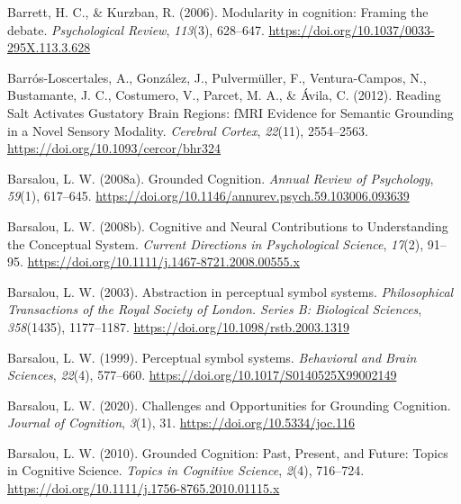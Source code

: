\documentclass[
  a4paper,12pt,twoside,onecolumn,openright,final,oldfontcommands]{memoir}
\newlength{\cslhangindent}
\newlength{\cslentryspacingunit} %
\newenvironment{CSLReferences}[2] %
 {%
  \setlength{\parindent}{0pt}
  \ifodd #1
  \let\oldpar\par
  \def\par{\hangindent=\cslhangindent\oldpar}
  \fi
  \setlength{\parskip}{#2\cslentryspacingunit}
 }%
 {}
\begin{document}
\begin{CSLReferences}{1}{0}
\leavevmode{}%
Barrett, H. C., \& Kurzban, R. (2006). Modularity in cognition: {Framing} the debate. \emph{Psychological Review}, \emph{113}(3), 628--647. \url{https://doi.org/10.1037/0033-295X.113.3.628}

\leavevmode{}%
Barrós-Loscertales, A., González, J., Pulvermüller, F., Ventura-Campos, N., Bustamante, J. C., Costumero, V., Parcet, M. A., \& Ávila, C. (2012). Reading {Salt} {Activates} {Gustatory} {Brain} {Regions}: {fMRI} {Evidence} for {Semantic} {Grounding} in a {Novel} {Sensory} {Modality}. \emph{Cerebral Cortex}, \emph{22}(11), 2554--2563. \url{https://doi.org/10.1093/cercor/bhr324}

\leavevmode{}%
Barsalou, L. W. (2008a). Grounded {Cognition}. \emph{Annual Review of Psychology}, \emph{59}(1), 617--645. \url{https://doi.org/10.1146/annurev.psych.59.103006.093639}

\leavevmode{}%
Barsalou, L. W. (2008b). Cognitive and {Neural} {Contributions} to {Understanding} the {Conceptual} {System}. \emph{Current Directions in Psychological Science}, \emph{17}(2), 91--95. \url{https://doi.org/10.1111/j.1467-8721.2008.00555.x}

\leavevmode{}%
Barsalou, L. W. (2003). Abstraction in perceptual symbol systems. \emph{Philosophical Transactions of the Royal Society of London. Series B: Biological Sciences}, \emph{358}(1435), 1177--1187. \url{https://doi.org/10.1098/rstb.2003.1319}

\leavevmode{}%
Barsalou, L. W. (1999). Perceptual symbol systems. \emph{Behavioral and Brain Sciences}, \emph{22}(4), 577--660. \url{https://doi.org/10.1017/S0140525X99002149}

\leavevmode{}%
Barsalou, L. W. (2020). Challenges and {Opportunities} for {Grounding} {Cognition}. \emph{Journal of Cognition}, \emph{3}(1), 31. \url{https://doi.org/10.5334/joc.116}

\leavevmode{}%
Barsalou, L. W. (2010). Grounded {Cognition}: {Past}, {Present}, and {Future}: {Topics} in {Cognitive} {Science}. \emph{Topics in Cognitive Science}, \emph{2}(4), 716--724. \url{https://doi.org/10.1111/j.1756-8765.2010.01115.x}


\end{CSLReferences}
\end{document}
